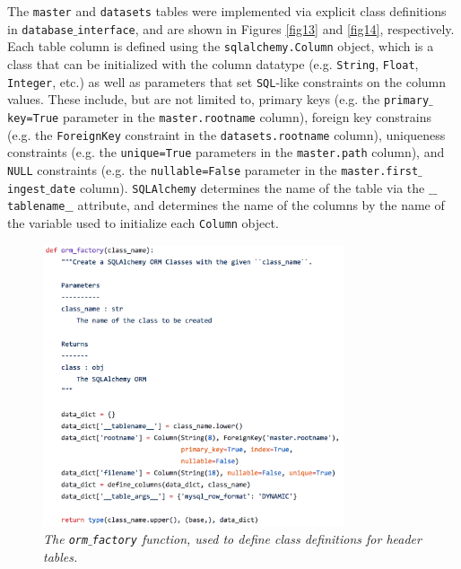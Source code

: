\documentclass[10pt,journal,compsoc]{IEEEtran}
\begin{document}
The \texttt{master} and \texttt{datasets} tables were implemented via explicit class definitions in \texttt{database$\_$interface}, and are shown in Figures \ref{fig13} and \ref{fig14},
respectively.  Each table column is defined using the \texttt{sqlalchemy.Column} object, which is a class that can be initialized with the column datatype (e.g. \texttt{String},
\texttt{Float}, \texttt{Integer}, etc.) as well as parameters that set \texttt{SQL}-like constraints on the column values.  These include, but are not limited to,
primary keys (e.g. the \texttt{primary$\_$key=True} parameter in the \texttt{master.rootname} column), foreign key constrains (e.g. the \texttt{ForeignKey} constraint in the
\texttt{datasets.rootname} column), uniqueness constraints (e.g. the \texttt{unique=True} parameters in the \texttt{master.path} column), and \texttt{NULL} constraints (e.g. the
\texttt{nullable=False} parameter in the \texttt{master.first$\_$ingest$\_$date} column).  \texttt{SQLAlchemy} determines the name of the table via the \texttt{$\_$$\_$tablename$\_$$\_$}
attribute, and determines the name of the columns by the name of the variable used to initialize each \texttt{Column} object.

\begin{figure}[!h]
\centering
\includegraphics[width=3.5in]{./figures/orm_factory.png}
\caption{\textit{The \texttt{orm$\_$factory} function, used to define class definitions for header tables.}}
\label{fig15}
\end{figure}
\end{document}
